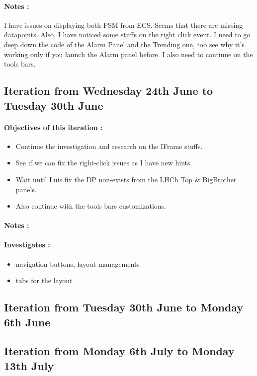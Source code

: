 \documentclass[a4paper, 12pt]{article}
\begin{document}
\begin{appendix}
    \paragraph{Notes :}
    I have issues on displaying both FSM from ECS. Seems that there are missing datapoints. Also, I have noticed some stuffs on the right click event.
    I need to go deep down the code of the Alarm Panel and the Trending one, too see why it's working only if you launch the Alarm panel before.
    I also need to continue on the tools bars.
    \subsection{Iteration from Wednesday 24th June to Tuesday 30th June}
    \paragraph{Objectives of this iteration :}
    \begin{itemize}
        \item Continue the investigation and research on the IFrame stuffs.
        \item See if we can fix the right-click issues as I have new hints.
        \item Wait until Luis fix the DP non-exists from the LHCb Top \& BigBrother panels.
        \item Also continue with the tools bars customizations.
    \end{itemize}
    \paragraph{Notes :}
    \paragraph{Investigates :}
    \begin{itemize}
        \item navigation buttons, layout managements
        \item tabs for the layout
    \end{itemize}
    \subsection{Iteration from Tuesday 30th June to Monday 6th June}
    \subsection{Iteration from Monday 6th July to Monday 13th July}

\end{appendix}
\end{document}
